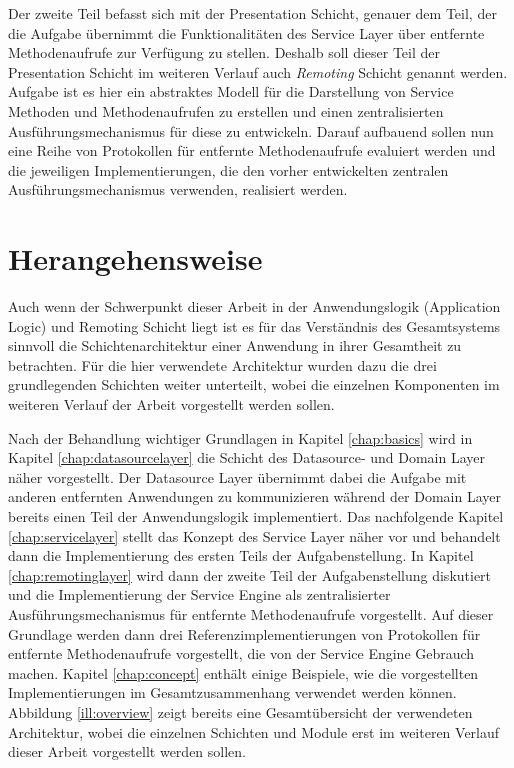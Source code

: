 Der zweite Teil befasst sich mit der Presentation Schicht, genauer dem Teil,
der die Aufgabe übernimmt die Funktionalitäten des Service Layer über entfernte
Methodenaufrufe zur Verfügung zu stellen. Deshalb soll dieser Teil der
Presentation Schicht im weiteren Verlauf auch \emph{Remoting} Schicht genannt
werden. Aufgabe ist es hier ein abstraktes Modell für die Darstellung von Service
Methoden und Methodenaufrufen zu erstellen und einen zentralisierten
Ausführungsmechanismus für diese zu entwickeln. Darauf aufbauend sollen nun
eine Reihe von Protokollen für entfernte Methodenaufrufe evaluiert werden und
die jeweiligen Implementierungen, die den vorher entwickelten zentralen
Ausführungsmechanismus verwenden, realisiert werden.

\section{Herangehensweise}
Auch wenn der Schwerpunkt dieser Arbeit in der Anwendungslogik (Application
Logic) und Remoting Schicht liegt ist es für das Verständnis des Gesamtsystems
sinnvoll die Schichtenarchitektur einer Anwendung in ihrer Gesamtheit zu
betrachten. Für die hier verwendete Architektur wurden dazu die drei
grundlegenden Schichten weiter unterteilt, wobei die einzelnen Komponenten im
weiteren Verlauf der Arbeit vorgestellt werden sollen.

Nach der Behandlung wichtiger Grundlagen in Kapitel \ref{chap:basics} wird in
Kapitel \ref{chap:datasourcelayer} die Schicht des Datasource- und Domain Layer
näher vorgestellt. Der Datasource Layer übernimmt dabei die Aufgabe mit anderen
entfernten Anwendungen zu kommunizieren während der Domain Layer bereits einen
Teil der Anwendungslogik implementiert. Das nachfolgende Kapitel
\ref{chap:servicelayer} stellt das Konzept des Service Layer näher vor und
behandelt dann die Implementierung des ersten Teils der Aufgabenstellung. In
Kapitel \ref{chap:remotinglayer} wird dann der zweite Teil der Aufgabenstellung
diskutiert und die Implementierung der Service Engine als zentralisierter
Ausführungsmechanismus für entfernte Methodenaufrufe vorgestellt. Auf dieser
Grundlage werden dann drei Referenzimplementierungen von Protokollen für
entfernte Methodenaufrufe vorgestellt, die von der Service Engine Gebrauch
machen. Kapitel \ref{chap:concept} enthält einige Beispiele, wie die
vorgestellten Implementierungen im Gesamtzusammenhang verwendet werden können.
Abbildung \ref{ill:overview} zeigt bereits eine Gesamtübersicht der verwendeten
Architektur, wobei die einzelnen Schichten und Module erst im weiteren Verlauf
dieser Arbeit vorgestellt werden sollen.

